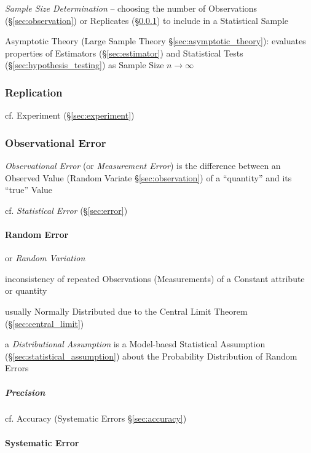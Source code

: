 \emph{Sample Size Determination} -- choosing the number of Observations
(\S\ref{sec:observation}) or Replicates (\S\ref{sec:replication}) to include in
a Statistical Sample

\fist Asymptotic Theory (Large Sample Theory \S\ref{sec:asymptotic_theory}):
evaluates properties of Estimators (\S\ref{sec:estimator}) and Statistical Tests
(\S\ref{sec:hypothesis_testing}) as Sample Size $n \rightarrow \infty$



\subsubsection{Replication}\label{sec:replication}

cf. Experiment (\S\ref{sec:experiment})



\subsubsection{Observational Error}\label{sec:observational_error}

\emph{Observational Error} (or \emph{Measurement Error}) is the difference
between an Observed Value (Random Variate \S\ref{sec:observation}) of a
``quantity'' and its ``true'' Value

cf. \emph{Statistical Error} (\S\ref{sec:error})



\paragraph{Random Error}\label{sec:random_error}\hfill

or \emph{Random Variation}

inconsistency of repeated Observations (Measurements) of a Constant attribute or
quantity

usually Normally Distributed due to the Central Limit Theorem
(\S\ref{sec:central_limit})

\fist a \emph{Distributional Assumption} is a Model-baesd Statistical Assumption
(\S\ref{sec:statistical_assumption}) about the Probability Distribution of
Random Errors



\subparagraph{Precision}\label{sec:precision}\hfill

cf. Accuracy (Systematic Errors \S\ref{sec:accuracy})



\paragraph{Systematic Error}\label{sec:systmatic_error}\hfill

